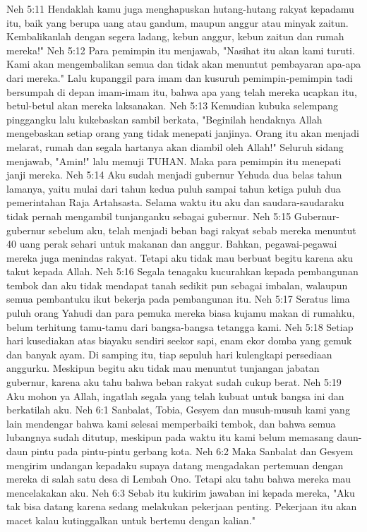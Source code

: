 Neh 5:11  Hendaklah kamu juga menghapuskan hutang-hutang rakyat kepadamu itu, baik yang berupa uang atau gandum, maupun anggur atau minyak zaitun. Kembalikanlah dengan segera ladang, kebun anggur, kebun zaitun dan rumah mereka!"
Neh 5:12  Para pemimpin itu menjawab, "Nasihat itu akan kami turuti. Kami akan mengembalikan semua dan tidak akan menuntut pembayaran apa-apa dari mereka." Lalu kupanggil para imam dan kusuruh pemimpin-pemimpin tadi bersumpah di depan imam-imam itu, bahwa apa yang telah mereka ucapkan itu, betul-betul akan mereka laksanakan.
Neh 5:13  Kemudian kubuka selempang pinggangku lalu kukebaskan sambil berkata, "Beginilah hendaknya Allah mengebaskan setiap orang yang tidak menepati janjinya. Orang itu akan menjadi melarat, rumah dan segala hartanya akan diambil oleh Allah!" Seluruh sidang menjawab, "Amin!" lalu memuji TUHAN. Maka para pemimpin itu menepati janji mereka.
Neh 5:14  Aku sudah menjadi gubernur Yehuda dua belas tahun lamanya, yaitu mulai dari tahun kedua puluh sampai tahun ketiga puluh dua pemerintahan Raja Artahsasta. Selama waktu itu aku dan saudara-saudaraku tidak pernah mengambil tunjanganku sebagai gubernur.
Neh 5:15  Gubernur-gubernur sebelum aku, telah menjadi beban bagi rakyat sebab mereka menuntut 40 uang perak sehari untuk makanan dan anggur. Bahkan, pegawai-pegawai mereka juga menindas rakyat. Tetapi aku tidak mau berbuat begitu karena aku takut kepada Allah.
Neh 5:16  Segala tenagaku kucurahkan kepada pembangunan tembok dan aku tidak mendapat tanah sedikit pun sebagai imbalan, walaupun semua pembantuku ikut bekerja pada pembangunan itu.
Neh 5:17  Seratus lima puluh orang Yahudi dan para pemuka mereka biasa kujamu makan di rumahku, belum terhitung tamu-tamu dari bangsa-bangsa tetangga kami.
Neh 5:18  Setiap hari kusediakan atas biayaku sendiri seekor sapi, enam ekor domba yang gemuk dan banyak ayam. Di samping itu, tiap sepuluh hari kulengkapi persediaan anggurku. Meskipun begitu aku tidak mau menuntut tunjangan jabatan gubernur, karena aku tahu bahwa beban rakyat sudah cukup berat.
Neh 5:19  Aku mohon ya Allah, ingatlah segala yang telah kubuat untuk bangsa ini dan berkatilah aku.
Neh 6:1  Sanbalat, Tobia, Gesyem dan musuh-musuh kami yang lain mendengar bahwa kami selesai memperbaiki tembok, dan bahwa semua lubangnya sudah ditutup, meskipun pada waktu itu kami belum memasang daun-daun pintu pada pintu-pintu gerbang kota.
Neh 6:2  Maka Sanbalat dan Gesyem mengirim undangan kepadaku supaya datang mengadakan pertemuan dengan mereka di salah satu desa di Lembah Ono. Tetapi aku tahu bahwa mereka mau mencelakakan aku.
Neh 6:3  Sebab itu kukirim jawaban ini kepada mereka, "Aku tak bisa datang karena sedang melakukan pekerjaan penting. Pekerjaan itu akan macet kalau kutinggalkan untuk bertemu dengan kalian."
